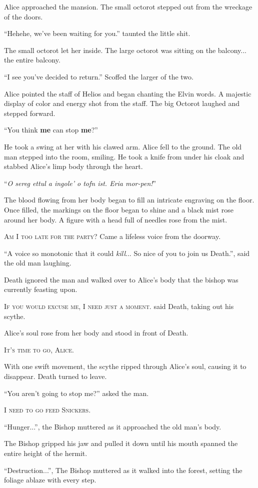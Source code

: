 \noindent
Alice approached the mansion.  The small octorot stepped out from the wreckage of the doors.
\VV


``Hehehe, we've been waiting for you.'' taunted the little shit.
\VV


\noindent
The small octorot let her inside.
The large octorot was sitting on the balcony... the entire balcony.
\VV


``I see you've decided to return.'' Scoffed the larger of the two.
\VV


\noindent
Alice pointed the staff of Helios and began chanting the Elvin words.
A majestic display of color and energy shot from the staff.
The big Octorot laughed and stepped forward.
\VV


``You think \textbf{me} can stop \textbf{me}?''
\VV


\noindent
He took a swing at her with his clawed arm.
Alice fell to the ground.
The old man stepped into the room, smiling.
He took a knife from under his cloak and stabbed Alice's limp body through the heart.
\VV


``\textit{O sereg ettul a ingole' o tofn ist. Eria mor-pen!}''
\VV


\noindent
The blood flowing from her body began to fill an intricate engraving on the floor.
Once filled, the markings on the floor began to shine and a black mist rose around her body.
A figure with a head full of needles rose from the mist.
\VV


\textsc{Am I too late for the party?} Came a lifeless voice from the doorway.


``A voice so monotonic that it could \textit{kill}... So nice of you to join us Death.'',
said the old man laughing.
\VV


\noindent
Death ignored the man and walked over to Alice's body that the bishop was currently feasting upon.
\VV


\textsc{If you would excuse me, I need just a moment.} said Death, taking out his scythe.
\VV


\noindent
Alice's soul rose from her body and stood in front of Death.
\VV


\textsc{It's time to go, Alice.}
\VV


\noindent
With one swift movement, the scythe ripped through Alice's soul, causing it to disappear.
Death turned to leave.
\VV


``You aren't going to stop me?'' asked the man.


\textsc{I need to go feed Snickers.}


``Hunger...'', the Bishop muttered as it approached the old man's body.
\VV


\noindent
The Bishop gripped his jaw and pulled it down until his mouth spanned the entire height of the hermit.
\VV


``Destruction...'', The Bishop muttered as it walked into the forest,
setting the foliage ablaze with every step.
